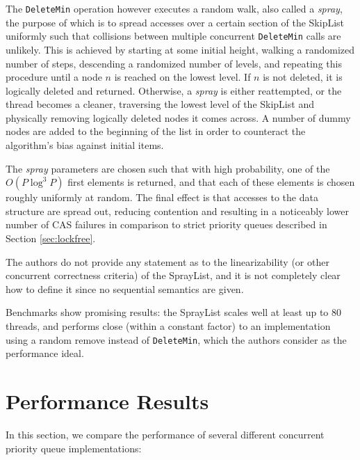 The \lstinline|DeleteMin| operation however executes a random walk, also called a \emph{spray}, the
purpose of which is to spread accesses over a certain section of the SkipList uniformly such that
collisions between multiple concurrent \lstinline|DeleteMin| calls are unlikely. This is achieved by
starting at some initial height, walking a randomized number of steps, descending a randomized number of levels,
and repeating this procedure until a node $n$ is reached on the lowest level. If $n$ is not deleted,
it is logically deleted and returned. Otherwise, a \emph{spray} is either reattempted, or the thread
becomes a cleaner, traversing the lowest level of the SkipList and physically removing logically deleted
nodes it comes across. A number of dummy nodes are added to the beginning of the list in order to counteract
the algorithm's bias against initial items.

The \emph{spray} parameters are chosen such that with high probability, one of the $O(P \log^3 P)$
first elements is returned, and that each of these elements is chosen roughly uniformly at random.
The final effect is that accesses to the data structure are spread out, reducing contention and resulting
in a noticeably lower number of \ac{CAS} failures in comparison to strict priority queues described
in Section \ref{sec:lockfree}.

The authors do not provide any statement as to the linearizability (or other concurrent correctness
criteria) of the SprayList, and it is not completely clear how to define it since no
sequential semantics are given.

Benchmarks show promising results: the SprayList scales well at least up to 80 threads,
and performs close (within a constant factor) to an implementation using a random remove instead
of \lstinline|DeleteMin|, which the authors consider as the performance ideal.


\section{Performance Results}

In this section, we compare the performance of several different concurrent priority
queue implementations:

